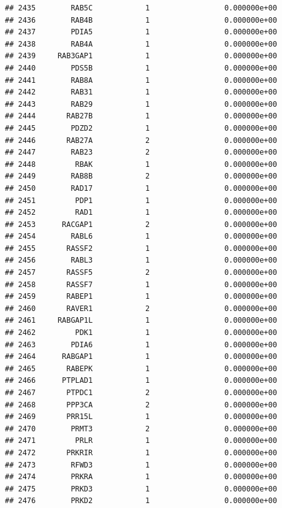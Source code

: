 \documentclass[
]{article}
\begin{document}
\begin{verbatim}
## 2435        RAB5C            1                 0.000000e+00
## 2436        RAB4B            1                 0.000000e+00
## 2437        PDIA5            1                 0.000000e+00
## 2438        RAB4A            1                 0.000000e+00
## 2439     RAB3GAP1            1                 0.000000e+00
## 2440        PDS5B            1                 0.000000e+00
## 2441        RAB8A            1                 0.000000e+00
## 2442        RAB31            1                 0.000000e+00
## 2443        RAB29            1                 0.000000e+00
## 2444       RAB27B            1                 0.000000e+00
## 2445        PDZD2            1                 0.000000e+00
## 2446       RAB27A            2                 0.000000e+00
## 2447        RAB23            2                 0.000000e+00
## 2448         RBAK            1                 0.000000e+00
## 2449        RAB8B            2                 0.000000e+00
## 2450        RAD17            1                 0.000000e+00
## 2451         PDP1            1                 0.000000e+00
## 2452         RAD1            1                 0.000000e+00
## 2453      RACGAP1            2                 0.000000e+00
## 2454        RABL6            1                 0.000000e+00
## 2455       RASSF2            1                 0.000000e+00
## 2456        RABL3            1                 0.000000e+00
## 2457       RASSF5            2                 0.000000e+00
## 2458       RASSF7            1                 0.000000e+00
## 2459       RABEP1            1                 0.000000e+00
## 2460       RAVER1            2                 0.000000e+00
## 2461     RABGAP1L            1                 0.000000e+00
## 2462         PDK1            1                 0.000000e+00
## 2463        PDIA6            1                 0.000000e+00
## 2464      RABGAP1            1                 0.000000e+00
## 2465       RABEPK            1                 0.000000e+00
## 2466      PTPLAD1            1                 0.000000e+00
## 2467       PTPDC1            2                 0.000000e+00
## 2468       PPP3CA            2                 0.000000e+00
## 2469       PRR15L            1                 0.000000e+00
## 2470        PRMT3            2                 0.000000e+00
## 2471         PRLR            1                 0.000000e+00
## 2472       PRKRIR            1                 0.000000e+00
## 2473        RFWD3            1                 0.000000e+00
## 2474        PRKRA            1                 0.000000e+00
## 2475        PRKD3            1                 0.000000e+00
## 2476        PRKD2            1                 0.000000e+00

\end{verbatim}
\end{document}
